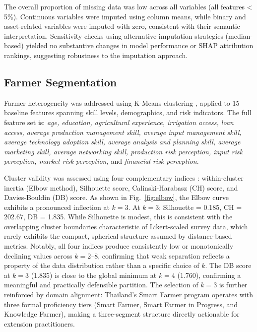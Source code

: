 \documentclass[3p,twocolumn,authoryear]{elsarticle}
\begin{document}
The overall proportion of missing data was low across all variables (all features < 5\%). 
Continuous variables were imputed using column means, while binary and asset-related variables 
were imputed with zero, consistent with their semantic interpretation. 
Sensitivity checks using alternative imputation strategies (median-based) yielded no substantive 
changes in model performance or SHAP attribution rankings, suggesting robustness to the imputation approach.

\subsection{Farmer Segmentation}

Farmer heterogeneity was addressed using K-Means clustering
\citep{macqueen1967}, applied to 15 baseline features spanning skill
levels, demographics, and risk indicators.
The full feature set is: \textit{age, education, agricultural experience,
irrigation access, loan access, average production management skill,
average input management skill, average technology adoption skill,
average analysis and planning skill, average marketing skill, average
networking skill, production risk perception, input risk perception,
market risk perception,} and \textit{financial risk perception}.

Cluster validity was assessed using four complementary indices
\citep{rouseeuw1987}: within-cluster inertia (Elbow method), Silhouette
score, Calinski-Harabasz (CH) score, and Davies-Bouldin (DB) score.
As shown in Fig.~\ref{fig:elbow}, the Elbow curve exhibits a pronounced
inflection at $k = 3$.
At $k = 3$: Silhouette = 0.185, CH = 202.67, DB = 1.835.
While Silhouette is modest, this is consistent with the overlapping
cluster boundaries characteristic of Likert-scaled survey data, which
rarely exhibits the compact, spherical structure assumed by
distance-based metrics.
Notably, all four indices produce consistently low or monotonically
declining values across $k = 2$--$8$, confirming that weak separation
reflects a property of the data distribution rather than a specific
choice of $k$.
The DB score at $k = 3$ (1.835) is close to the global minimum at
$k = 4$ (1.760), confirming a meaningful and practically defensible
partition.
The selection of $k = 3$ is further reinforced by domain alignment:
Thailand's Smart Farmer program operates with three formal proficiency
tiers (Smart Farmer, Smart Farmer in Progress, and Knowledge Farmer),
making a three-segment structure directly actionable for extension
practitioners.
\end{document}
